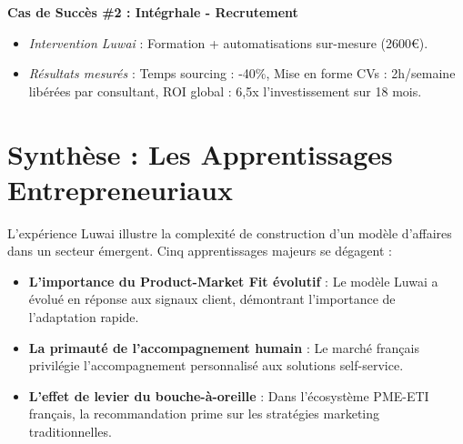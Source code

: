 \textbf{Cas de Succès \#2 : Intégrhale - Recrutement}
\begin{itemize}
    \item \emph{Intervention Luwai} : Formation + automatisations sur-mesure (2600€).
    \item \emph{Résultats mesurés} : Temps sourcing : -40\%, Mise en forme CVs : 2h/semaine libérées par consultant, ROI global : 6,5x l'investissement sur 18 mois.
\end{itemize}

\section{Synthèse : Les Apprentissages Entrepreneuriaux}

L'expérience Luwai illustre la complexité de construction d'un modèle d'affaires dans un secteur émergent. Cinq apprentissages majeurs se dégagent :

\begin{itemize}
    \item \textbf{L'importance du Product-Market Fit évolutif} : Le modèle Luwai a évolué en réponse aux signaux client, démontrant l'importance de l'adaptation rapide.
    \item \textbf{La primauté de l'accompagnement humain} : Le marché français privilégie l'accompagnement personnalisé aux solutions self-service.
    \item \textbf{L'effet de levier du bouche-à-oreille} : Dans l'écosystème PME-ETI français, la recommandation prime sur les stratégies marketing traditionnelles.
\end{itemize}
